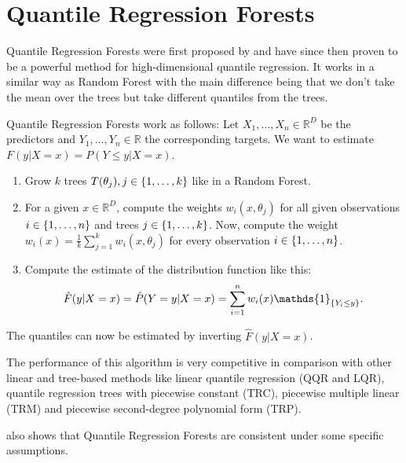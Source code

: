 \section{Quantile Regression Forests}
\label{sec:qrf}

Quantile Regression Forests were first proposed by \Textcite{Meinshausen2006}
and have since then proven to be a powerful method for high-dimensional quantile 
regression. It works in a similar way as Random Forest with the main difference 
being that we don't take the mean over the trees but take different quantiles 
from the trees.

Quantile Regression Forests work as follows:
Let \(X_1, \ldots, X_n \in \mathbb{R}^D\) be the predictors and 
\(Y_1, \ldots, Y_n \in \mathbb{R}\) the corresponding targets.
We want to estimate \(F(y|X=x) = P(Y\leq y| X = x)\).
\begin{enumerate}
    \item Grow \(k\) trees \(T(\theta_j), j\in\{1,\ldots,k\}\) like in a Random Forest.
    \item For a given \(x \in \mathbb{R}^D\), compute the weights \(w_i(x, \theta_j)\) 
    for all given observations \(i \in \{1,\ldots, n\}\) and trees \(j \in \{1, \ldots, k\}\).
    Now, compute the weight \(w_i(x) = \frac{1}{k} \sum_{j=1}^k w_i(x, \theta_j)\) for every 
    observation \(i \in \{1,\ldots, n\}\).
    \item Compute the estimate of the distribution function like this:
    \[ \hat{F}(y | X=x) = \hat{P}(Y=y | X=x) = \sum_{i=1}^n w_i(x) \mathds{1}_{\set{Y_i \leq y}}. \]
\end{enumerate}
The quantiles can now be estimated by inverting \(\hat{F}(y|X=x)\).

The performance of this algorithm is very competitive in comparison with other 
linear and tree-based methods like linear quantile regression (QQR and LQR), quantile regression trees with 
piecewise constant (TRC), piecewise multiple linear (TRM) and piecewise second-degree polynomial form (TRP).

\Textcite{Meinshausen2006} also shows that Quantile Regression Forests are consistent 
under some specific assumptions.